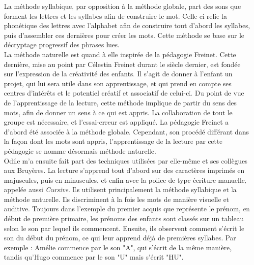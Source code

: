 La méthode syllabique, par opposition à la méthode globale, part des sons que forment les lettres et les syllabes afin de construire le mot. Celle-ci relie la phonétique des lettres avec l'alphabet afin de construire tout d'abord les syllabes, puis d'assembler ces dernières pour créer les mots. Cette méthode se base sur le décryptage progressif des phrases lues.\\

La méthode naturelle est quand à elle inspirée de la pédagogie Freinet. Cette dernière, mise au point par Célestin Freinet durant le siècle dernier, est fondée sur l'expression de la créativité des enfants. Il s'agit de donner à l'enfant un projet, qui lui sera utile dans son apprentissage, et qui prend en compte ses centres d'intérêts et le potentiel créatif et associatif de celui-ci. Du point de vue de l'apprentissage de la lecture, cette méthode implique de partir du sens des mots, afin de donner un sens à ce qui est appris. La collaboration de tout le groupe est nécessaire, et l'essai-erreur est appliqué. La pédagogie Freinet a d'abord été associée à la méthode globale. Cependant, son procédé différant dans la façon dont les mots sont appris, l'apprentissage de la lecture par cette pédagogie se nomme désormais méthode naturelle.\\

Odile m'a ensuite fait part des techniques utilisées par elle-même et ses collègues aux Bruyères. La lecture s'apprend tout d'abord sur des caractères imprimés en majuscules, puis en minuscules, et enfin avec la police de type écriture manuelle, appelée aussi \textit{Cursive}. Ils utilisent principalement la méthode syllabique et la méthode naturelle. Ils discriminent à la fois les mots de manière visuelle et auditive. Toujours dans l'exemple du premier acquis que représente le prénom, en début de première primaire, les prénoms des enfants sont classés sur un tableau selon le son par lequel ils commencent. Ensuite, ils observent comment s'écrit le son du début du prénom, ce qui leur apprend déjà de premières syllabes. Par exemple : Amélie commence par le son "A", qui s'écrit de la même manière, tandis qu'Hugo commence par le son "U" mais s'écrit "HU".\\

